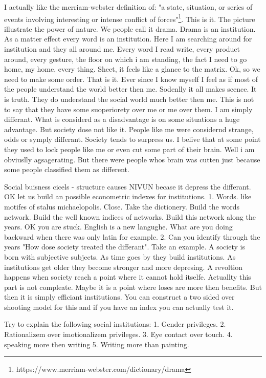 \documentclass[14pt,oneside]{amsart}
\begin{document}
I actually like the merriam-webster definition of: "a state, situation, or series of events involving interesting or intense conflict of forces"\footnote{https://www.merriam-webster.com/dictionary/drama}. 
This is it. The picture illustrate the power of nature. We people call it drama. Drama is an institution. As a matter effect every word is an institution. Here I am searching around for institution and they all around me. Every word I read write, every product around, every gesture, the floor on which i am standing, the fact I need to go home, my home, every thing. Sheet, it feels like a glance to the matrix. Ok, so we need to make some order. That is it. Ever since I know myself I feel as if most of the people understand the world better then me. Sodenlly it all makes scence. It is truth. They do understand the social world much better then me. This is not to say that they have some suoperiorety over me or me over them. I am simply differant. What is considerd as a disadvantage is on some situations a huge advantage. But society dose not like it. People like me were considernd strange, odds or symply differant. Society tends to surpress us. I belive that at some point they used to lock people like me or even cut some part of their brain. Well i am obviuslly agsagerating. But there were people whos brain was cutten just because some people classified them as different. 
 


Social buisness cicels - structure causes NIVUN becase it depress the differant. OK let us build an possible econometric indexes for institutions. 
1. Words. like motifes of stalus michaelopolis. Close. Take the dictionery. Build the words network. Build the well known indices of networks. Build this network along the years. OK you are stuck. English is a new langughe. What are you doing backward when there was only latin for example. 
2. Can you identify through the years "How dose society treated the differant". Take an example. A society is born with subjective subjects. As time goes by they build institutions. As institutions get older they become stronger and more depresing. A revoltion happens when society reach a point where it cannot hold itselfe. Actuallty this part is not compleate. Maybe it is a point where loses are more then benefits. But then it is simply efficiant institutions. You can construct a two sided over shooting model for this and if you have an index you can actually test it. 

Try to explain the following social institutions:
1. Gender privileges.
2. Rationalizem over imotionalizem privileges.
3. Eye contact over touch.
4. speaking more then writing
5. Writing more than painting.
\end{document}
